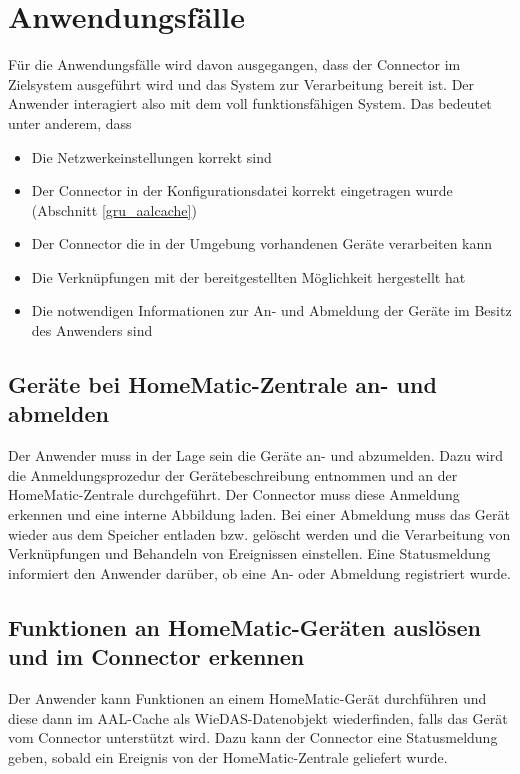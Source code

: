 \section{Anwendungsfälle}
\label{ana_uc}

Für die Anwendungsfälle wird davon ausgegangen, dass der Connector im Zielsystem ausgeführt wird
und das System zur Verarbeitung bereit ist.
Der Anwender interagiert also mit dem voll funktionsfähigen System.
Das bedeutet unter anderem, dass
\begin{itemize}
\item Die Netzwerkeinstellungen korrekt sind
\item Der Connector in der Konfigurationsdatei korrekt eingetragen wurde (Abschnitt \ref{gru_aalcache})
\item Der Connector die in der Umgebung vorhandenen Geräte verarbeiten kann
\item Die Verknüpfungen mit der bereitgestellten Möglichkeit hergestellt hat
\item Die notwendigen Informationen zur An- und Abmeldung der Geräte im Besitz des Anwenders sind
\end{itemize}


\subsection{Geräte bei HomeMatic-Zentrale an- und abmelden}
\label{uc1}
Der Anwender muss in der Lage sein die Geräte an- und abzumelden.
Dazu wird die Anmeldungsprozedur der Gerätebeschreibung entnommen und an der HomeMatic-Zentrale
durchgeführt.
Der Connector muss diese Anmeldung erkennen und eine interne Abbildung laden.
Bei einer Abmeldung muss das Gerät wieder aus dem Speicher entladen bzw. gelöscht werden und
die Verarbeitung von Verknüpfungen und Behandeln von Ereignissen einstellen.
Eine Statusmeldung informiert den Anwender darüber, ob eine An- oder Abmeldung registriert wurde.

\subsection{Funktionen an HomeMatic-Geräten auslösen und im Connector erkennen}
\label{uc2}
Der Anwender kann Funktionen an einem HomeMatic-Gerät durchführen und diese dann
im AAL-Cache als WieDAS-Datenobjekt wiederfinden, falls das Gerät vom Connector
unterstützt wird.
Dazu kann der Connector eine Statusmeldung geben, sobald ein Ereignis von der HomeMatic-Zentrale
geliefert wurde.

